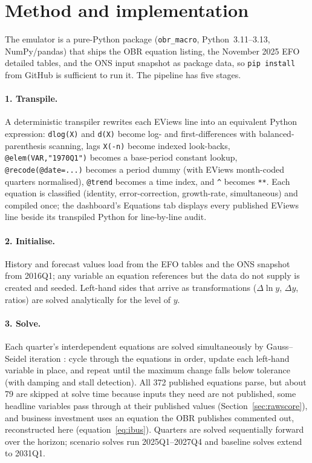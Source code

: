 \section{Method and implementation}
\label{sec:method}

The emulator is a pure-Python package (\texttt{obr\_macro}, Python~3.11--3.13, NumPy/pandas) that ships the OBR equation listing, the November 2025 EFO detailed tables, and the ONS input snapshot as package data, so \texttt{pip install} from GitHub is sufficient to run it. The pipeline has five stages.

\paragraph{1. Transpile.} A deterministic transpiler rewrites each EViews line into an equivalent Python expression: \texttt{dlog(X)} and \texttt{d(X)} become log- and first-differences with balanced-parenthesis scanning, lags \texttt{X(-n)} become indexed look-backs, \texttt{@elem(VAR,"1970Q1")} becomes a base-period constant lookup, \texttt{@recode(@date=...)} becomes a period dummy (with EViews month-coded quarters normalised), \texttt{@trend} becomes a time index, and \texttt{\^{}} becomes \texttt{**}. Each equation is classified (identity, error-correction, growth-rate, simultaneous) and compiled once; the dashboard's Equations tab displays every published EViews line beside its transpiled Python for line-by-line audit.

\paragraph{2. Initialise.} History and forecast values load from the EFO tables and the ONS snapshot from 2016Q1; any variable an equation references but the data do not supply is created and seeded. Left-hand sides that arrive as transformations ($\Delta\ln y$, $\Delta y$, ratios) are solved analytically for the level of $y$.

\paragraph{3. Solve.} Each quarter's interdependent equations are solved simultaneously by Gauss--Seidel iteration \citep{fair2004}: cycle through the equations in order, update each left-hand variable in place, and repeat until the maximum change falls below tolerance (with damping and stall detection). All 372 published equations parse, but about 79 are skipped at solve time because inputs they need are not published, some headline variables pass through at their published values (Section~\ref{sec:rawscore}), and business investment uses an equation the OBR publishes commented out, reconstructed here (equation~\eqref{eq:ibus}). Quarters are solved sequentially forward over the horizon; scenario solves run 2025Q1--2027Q4 and baseline solves extend to 2031Q1.

